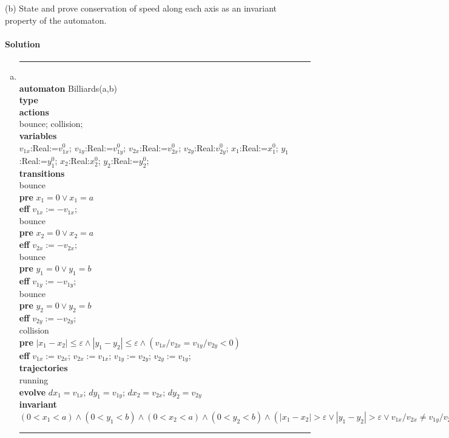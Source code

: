 \documentclass[11pt]{article}
\newcommand{\tab}{\hspace*{5mm}}
\begin{document}
(b) State and prove conservation of speed along each axis as an invariant property of the automaton.

\paragraph{Solution}
\begin{enumerate}[(a)]
\item
\noindent\rule{7cm}{1.0pt}\\
\textbf{automaton} Billiards(a,b)\\
\tab\textbf{type}\\
\tab\textbf{actions}\\
\tab\tab bounce; collision;\\
\tab\textbf{variables}\\
\tab\tab $v_{1x}$:Real:=$v_{1x}^0$; $v_{1y}$:Real:=$v_{1y}^0$; $v_{2x}$:Real:=$v_{2x}^0$; $v_{2y}$:Real:$v_{2y}^0$; $x_1$:Real:=$x_1^0$; $y_1$:Real:=$y_1^0$; $x_2$:Real:$x_2^0$; $y_2$:Real:=$y_2^0$;\\
\tab\textbf{transitions}\\
\tab\tab bounce\\
\tab\tab \textbf{pre} $x_1 = 0 \vee x_1 = a$\\
\tab\tab \textbf{eff} $v_{1x} := -v_{1x}$;\\
\tab\tab bounce\\
\tab\tab \textbf{pre} $x_2 = 0 \vee x_2 = a$\\
\tab\tab \textbf{eff} $v_{2x} := -v_{2x}$;\\
\tab\tab bounce\\
\tab\tab \textbf{pre} $y_1 = 0 \vee y_1 = b$\\
\tab\tab \textbf{eff} $v_{1y} := -v_{1y}$;\\
\tab\tab bounce\\
\tab\tab \textbf{pre} $y_2 = 0 \vee y_2 = b$\\
\tab\tab \textbf{eff} $v_{2y} := -v_{2y}$;\\
\tab\tab collision\\
\tab\tab \textbf{pre} $|x_1-x_2| \leq \varepsilon \wedge |y_1-y_2| \leq \varepsilon \wedge (v_{1x}/v_{2x} = v_{1y}/v_{2y} < 0)$\\
\tab\tab \textbf{eff} $v_{1x} := v_{2x}$; $v_{2x} := v_{1x}$; $v_{1y} := v_{2y}$; $v_{2y} := v_{1y}$;\\
\tab\textbf{trajectories}\\
\tab\tab running\\
\tab\tab \textbf{evolve} $dx_1 = v_{1x}$; $dy_1 = v_{1y}$; $dx_2 = v_{2x}$; $dy_2 = v_{2y}$\\
\tab\tab \textbf{invariant} $(0<x_1<a) \wedge (0<y_1<b) \wedge (0<x_2<a) \wedge (0<y_2<b) \wedge (|x_1-x_2| > \varepsilon \vee |y_1-y_2| > \varepsilon \vee v_{1x}/v_{2x} \neq v_{1y}/v_{2y} \vee v_{1x}/v_{2x} \geq 0)$\\
\noindent\rule{7cm}{1.0pt}


\end{enumerate}
\end{document}
